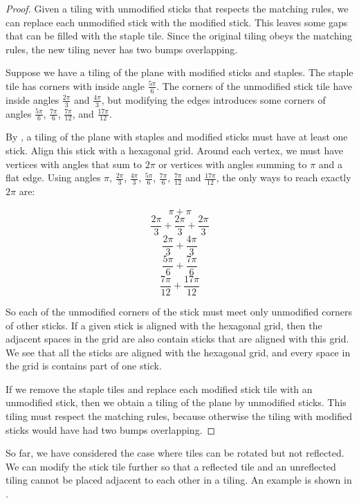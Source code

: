 \documentclass[11pt]{article}
\theoremstyle{plain}
\theoremstyle{definition}
\begin{document}
\begin{proof}
Given a tiling with unmodified sticks that respects the matching rules, we can replace each unmodified stick with the modified stick. This leaves some gaps that can be filled with the staple tile. Since the original tiling obeys the matching rules, the new tiling never has two bumps overlapping.

Suppose we have a tiling of the plane with modified sticks and staples. The staple tile has corners with inside angle $\frac{5\pi}{6}$. The corners of the unmodified stick tile have inside angles $\frac{2\pi}{3}$ and $\frac{4\pi}{3}$, but modifying the edges introduces some corners of angles $\frac{5\pi}{6}$, $\frac{7\pi}{6}$, $\frac{7\pi}{12}$, and $\frac{17\pi}{12}$. 

By , a tiling of the plane with staples and modified sticks must have at least one stick. Align this stick with a hexagonal grid. Around each vertex, we must have vertices with angles that sum to $2\pi$ or vertices with angles summing to $\pi$ and a flat edge. Using angles $\pi$, $\frac{2\pi}{3}$, $\frac{4\pi}{3}$, $\frac{5\pi}{6}$, $\frac{7\pi}{6}$, $\frac{7\pi}{12}$ and $\frac{17\pi}{12}$, the only ways to reach exactly $2\pi$ are:

\[\pi+\pi\]
\[\frac{2\pi}{3}+\frac{2\pi}{3}+\frac{2\pi}{3}\]
\[\frac{2\pi}{3}+\frac{4\pi}{3}\]
\[\frac{5\pi}{6}+\frac{7\pi}{6}\]
\[\frac{7\pi}{12}+\frac{17\pi}{12}\]

So each of the unmodified corners of the stick must meet only unmodified corners of other sticks. If a given stick is aligned with the hexagonal grid, then the adjacent spaces in the grid are also contain sticks that are aligned with this grid. We see that all the sticks are aligned with the hexagonal grid, and every space in the grid is contains part of one stick. 

If we remove the staple tiles and replace each modified stick tile with an unmodified stick, then we obtain a tiling of the plane by unmodified sticks. This tiling must respect the matching rules, because otherwise the tiling with modified sticks would have had two bumps overlapping.
\end{proof}

So far, we have considered the case where tiles can be rotated but not reflected. We can modify the stick tile further so that a reflected tile and an unreflected tiling cannot be placed adjacent to each other in a tiling. An example is shown in .
\end{document}

